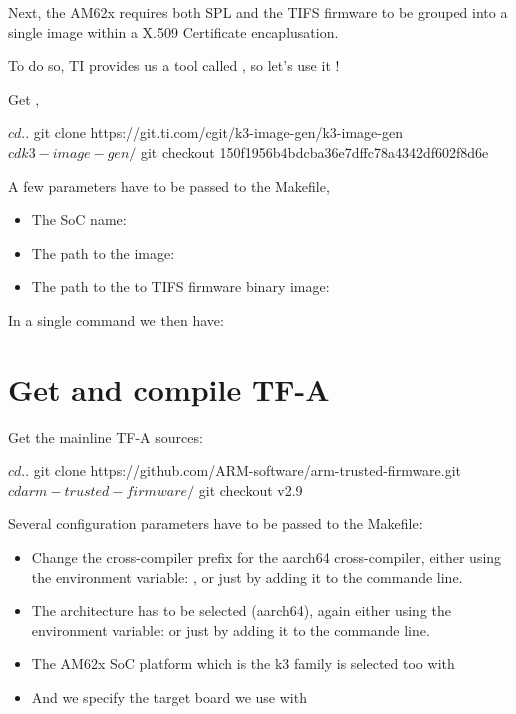 Next, the AM62x requires both SPL and the TIFS firmware to be grouped into a
single image within a X.509 Certificate encaplusation.

To do so, TI provides us a tool called , so let's use it !

Get ,
\begin{bashinput}
$ cd ..
$ git clone https://git.ti.com/cgit/k3-image-gen/k3-image-gen
$ cd k3-image-gen/
$ git checkout 150f1956b4bdcba36e7dffc78a4342df602f8d6e
\end{bashinput}

A few parameters have to be passed to the Makefile,
\begin{itemize}
\item The SoC name: 
\item The path to the  image:
\item The path to the to TIFS firmware binary image:
\end{itemize}

In a single command we then have:


\section{Get and compile TF-A}
Get the mainline TF-A sources:

\begin{bashinput}
$ cd ..
$ git clone https://github.com/ARM-software/arm-trusted-firmware.git
$ cd arm-trusted-firmware/
$ git checkout v2.9
\end{bashinput}

Several configuration parameters have to be passed to the Makefile:
\begin{itemize}
\item Change the cross-compiler prefix for the aarch64 cross-compiler,
      either using the environment variable:
      , or just by
      adding it to the  commande line.
\item The architecture has to be selected (aarch64),
      again either using the environment variable: 
      or just by adding it to the  commande line.
\item The AM62x SoC platform which is the k3 family is selected
      too with 
\item And we specify the target board we use with 
\end{itemize}

